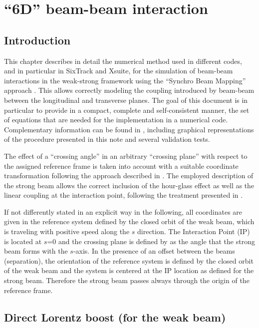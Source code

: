\chapter{``6D'' beam-beam interaction}

\section{Introduction} 

This chapter describes in detail the numerical method used in different codes, and in particular in SixTrack \cite{sixtracksite} and Xsuite, for the simulation of beam-beam interactions in the weak-strong framework using the ``Synchro Beam Mapping'' 
approach \cite{hirata}.  This allows correctly modeling the coupling introduced by beam-beam between the longitudinal and transverse planes. The goal of this document is  in particular to provide in a compact, complete and self-consistent manner, the set of equations that are needed for the implementation in a numerical code. 
Complementary information can be found in \cite{bb6dslides}, including graphical representations of the procedure presented in this note and several validation tests.

The effect of a ``crossing angle'' in an arbitrary ``crossing plane'' with respect to the assigned reference frame is taken into account with a suitable coordinate transformation following the approach described in \cite{hirata, beam_beam}. The employed description of the strong beam allows the correct inclusion of the hour-glass effect as well as the linear coupling at the interaction point, following the treatment presented in \cite{beam_beam}. 


If not differently stated in an explicit way in the following, all coordinates are given in the reference system defined by the closed orbit of the weak beam, which is traveling with positive speed along the $s$ direction. The Interaction Point (IP) is located at $s$=0 and the crossing plane is defined by as the angle that the strong beam forms with the $s$-axis. In the presence of an offset between the beams (separation), the orientation of the reference system is defined by the closed orbit of the weak beam and the system is centered at the IP location as defined for the strong beam. Therefore the strong beam passes always through the origin of the reference frame.




\section{Direct Lorentz boost (for the weak beam)}
\label{sec:directboost}

